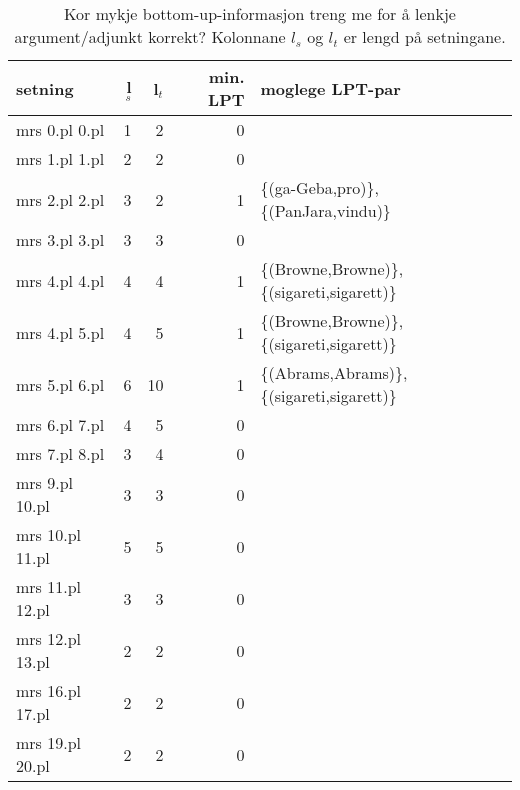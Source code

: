 \documentclass[11pt,a4paper,oneside,draft]{report}
\begin{document}
\begin{table}[htb]
\caption{\label{tbl:LPT}Kor mykje bottom-up-informasjon treng me for å lenkje argument/adjunkt korrekt? Kolonnane $l_s$ og $l_t$ er lengd på setningane.}
\begin{center}
\begin{tabular}{lrrrl}
 setning            &  l$_s$  &  l$_t$  &  min. LPT  &  moglege LPT-par                               \\
\hline
 mrs 0.pl 0.pl      &      1  &      2  &         0  &                                                \\
 mrs 1.pl 1.pl      &      2  &      2  &         0  &                                                \\
 mrs 2.pl 2.pl      &      3  &      2  &         1  &  \{(ga-Geba,pro)\}, \{(PanJara,vindu)\}        \\
 mrs 3.pl 3.pl      &      3  &      3  &         0  &                                                \\
 mrs 4.pl 4.pl      &      4  &      4  &         1  &  \{(Browne,Browne)\}, \{(sigareti,sigarett)\}  \\
 mrs 4.pl 5.pl      &      4  &      5  &         1  &  \{(Browne,Browne)\}, \{(sigareti,sigarett)\}  \\
 mrs 5.pl 6.pl      &      6  &     10  &         1  &  \{(Abrams,Abrams)\}, \{(sigareti,sigarett)\}  \\
 mrs 6.pl 7.pl      &      4  &      5  &         0  &                                                \\
 mrs 7.pl 8.pl      &      3  &      4  &         0  &                                                \\
 mrs 9.pl 10.pl     &      3  &      3  &         0  &                                                \\
 mrs 10.pl 11.pl    &      5  &      5  &         0  &                                                \\
 mrs 11.pl 12.pl    &      3  &      3  &         0  &                                                \\
 mrs 12.pl 13.pl    &      2  &      2  &         0  &                                                \\
 mrs 16.pl 17.pl    &      2  &      2  &         0  &                                                \\
 mrs 19.pl 20.pl    &      2  &      2  &         0  &                                                \\

\end{tabular}
\end{center}
\end{table}
\end{document}
